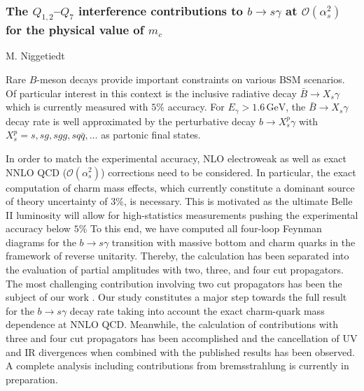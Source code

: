 \documentclass{FBR_Bericht_2025}
\begin{document}
\begin{refsection}
\subsubsection{The $Q_{1,2}$--$Q_7$ interference contributions to $b \to s \gamma$ at ${\mathcal{O}}(\alpha_s^2)$ for the physical value of $m_c$}
\begin{Namen}
M. Niggetiedt
\end{Namen}
%
Rare $B$-meson decays provide important constraints on various BSM scenarios. Of particular interest in this context is the inclusive radiative decay $\bar{B}\to X_s\gamma$ which is currently measured with $5\%$ accuracy. %
For $E_\gamma > 1.6 \,\mathrm{GeV}$, the $\bar{B}\to X_s\gamma$ decay rate is well approximated by the perturbative decay $b\to X_s^p\gamma$ with $X_s^p = s,sg,sgg,sq\bar{q},\ldots$ as partonic final states. 

In order to match the experimental accuracy, NLO electroweak as well as exact NNLO QCD (${\mathcal{O}}(\alpha_s^2)$) corrections need to be considered. %
%
In particular, the exact computation of charm mass effects, which currently constitute a dominant source of theory uncertainty of $3\%$, is necessary. This is motivated as the ultimate Belle II luminosity will allow for high-statistics measurements pushing the experimental accuracy below $5\%$
%
To this end, we have computed all four-loop Feynman diagrams for the $b \to s \gamma$ transition with massive bottom and charm quarks in the framework of reverse unitarity. Thereby, the calculation has been separated into the evaluation of partial amplitudes with two, three, and four cut propagators. The most challenging contribution involving two cut propagators has been the subject of our work \cite{Czaja:2023ren}. 
%
Our study constitutes a major step towards the full result for the $b \to s \gamma$ decay rate taking into account the exact charm-quark mass dependence at NNLO QCD. Meanwhile, the calculation of contributions with three and four cut propagators has been accomplished and the cancellation of UV and IR divergences when combined with the published results \cite{Czaja:2023ren} has been observed. A complete analysis including contributions from bremsstrahlung is currently in preparation. 


\end{refsection}
\end{document}
